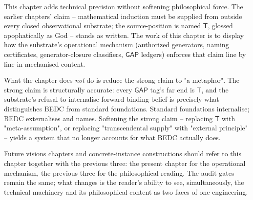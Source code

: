 This chapter adds technical precision without softening philosophical force. The earlier chapters' claim -- mathematical induction must be supplied from outside every closed observational substrate; the source-position is named $\mathsf{T}$, glossed apophatically as God -- stands as written. The work of this chapter is to display how the substrate's operational mechanism (authorized generators, naming certificates, generator-closure classifiers, $\mathsf{GAP}$ ledgers) enforces that claim line by line in mechanised content.

What the chapter does \emph{not} do is reduce the strong claim to "a metaphor". The strong claim is structurally accurate: every $\mathsf{GAP}$ tag's far end is $\mathsf{T}$, and the substrate's refusal to internalise forward-binding belief is precisely what distinguishes BEDC from standard foundations. Standard foundations internalise; BEDC externalises and names. Softening the strong claim -- replacing $\mathsf{T}$ with "meta-assumption", or replacing "transcendental supply" with "external principle" -- yields a system that no longer accounts for what BEDC actually does.

Future visions chapters and concrete-instance constructions should refer to this chapter together with the previous three: the present chapter for the operational mechanism, the previous three for the philosophical reading. The audit gates remain the same; what changes is the reader's ability to see, simultaneously, the technical machinery and its philosophical content as two faces of one engineering.

